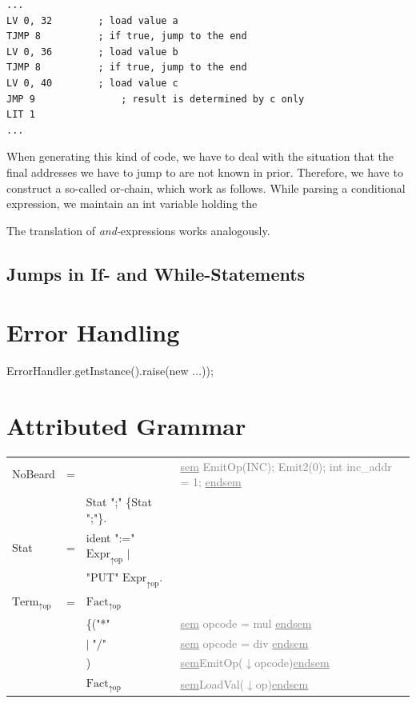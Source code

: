 \documentclass[11pt]{report}
\newcommand{\leongage}{NoBeard}
\newcommand{\alternative}{$\mid \;$}
\newenvironment{atg}[1][6cm]
	{\begin{tabular}[b]{lclp{#1}}}
	{\end{tabular}}
\newcommand{\atgsy}[2]{$\textrm{#1}_\textrm{#2}$}
\newcommand{\outattr}{$\uparrow$}
\newcommand{\inattr}{$\downarrow$}
\newcommand{\semantics}[1]{\textcolor{Gray}{#1}}
\newenvironment {sem}
	{\underline{sem}}
	{\underline{endsem}}
\begin{document}

\begin{lstlisting}[float,caption={Assembler code of or-chain}, captionpos=b,label=cod:orchain]
...
LV 0, 32		; load value a
TJMP 8			; if true, jump to the end
LV 0, 36		; load value b
TJMP 8			; if true, jump to the end
LV 0, 40		; load value c
JMP 9				; result is determined by c only
LIT 1
...
\end{lstlisting}
When generating this kind of code, we have to deal with the situation that the final addresses we have to jump to are not known in prior. Therefore, we have to construct a so-called or-chain, which work as follows. While parsing a conditional expression, we maintain an int variable holding the 

The translation of {\em and-}expressions works analogously.

\section{Jumps in If- and While-Statements}

\chapter{Error Handling}
ErrorHandler.getInstance().raise(new ...));

\chapter{Attributed Grammar}
\begin{atg}[4.5cm]
\leongage &=& & \semantics{\begin{sem} \newline EmitOp(INC); \newline Emit2(0); \newline int inc\_addr = 1; \newline \end{sem}}\\
&&Stat ";" \{Stat ";"\}. \\

Stat & = & ident ":=" \atgsy{Expr}{\outattr op}  \alternative \\
&& "PUT" \atgsy{Expr}{\outattr op}. \\

\atgsy{Term}{\outattr op} &=& \atgsy{Fact}{\outattr op}  \\
&& \{("*" &\semantics{\begin{sem} opcode = mul \end{sem}}\\
&& \alternative "/" & \semantics{\begin{sem} opcode = div \end{sem}}\\
&&) & \semantics{\begin{sem}EmitOp(\inattr opcode)\end{sem}}\\
&&\atgsy{Fact}{\outattr op} & \semantics{\begin{sem}LoadVal(\inattr op)\end{sem}}
\end{atg}

{}
\end{document}
